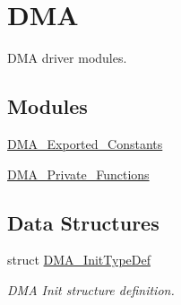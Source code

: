 \hypertarget{group___d_m_a}{\section{D\-M\-A}
\label{group___d_m_a}
}


D\-M\-A driver modules.  


\subsection*{Modules}
\begin{DoxyCompactItemize}
\item 
\hyperlink{group___d_m_a___exported___constants}{D\-M\-A\-\_\-\-Exported\-\_\-\-Constants}
\item 
\hyperlink{group___d_m_a___private___functions}{D\-M\-A\-\_\-\-Private\-\_\-\-Functions}
\end{DoxyCompactItemize}
\subsection*{Data Structures}
\begin{DoxyCompactItemize}
\item 
struct \hyperlink{struct_d_m_a___init_type_def}{D\-M\-A\-\_\-\-Init\-Type\-Def}
\begin{DoxyCompactList}\small\item\em D\-M\-A Init structure definition. \end{DoxyCompactList}\end{DoxyCompactItemize}
